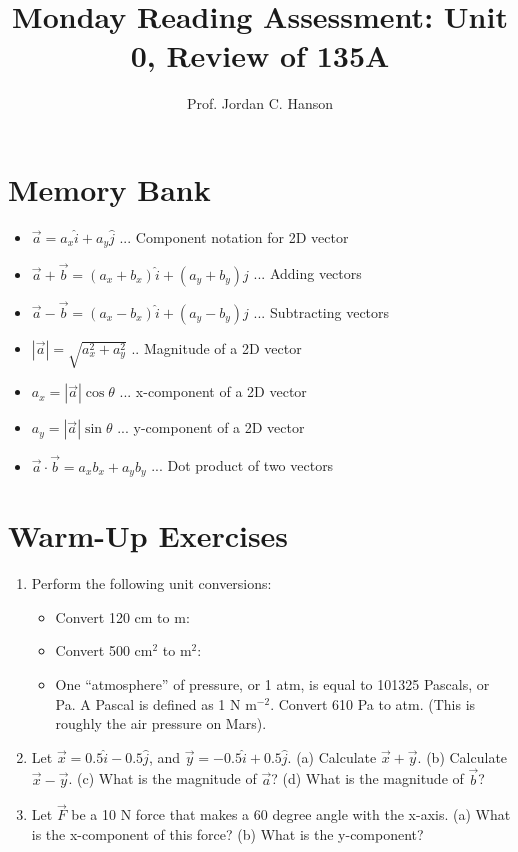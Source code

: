 \documentclass{article}
\begin{document}
\title{Monday Reading Assessment: Unit 0, Review of 135A}
\author{Prof. Jordan C. Hanson}

\maketitle

\section{Memory Bank}

\begin{itemize}
\item $\vec{a} = a_x \hat{i} + a_y \hat{j}$ ... Component notation for 2D vector
\item $\vec{a} + \vec{b} = (a_x + b_x)\hat{i} + (a_y + b_y)\hat{j}$ ... Adding vectors
\item $\vec{a} - \vec{b} = (a_x - b_x)\hat{i} + (a_y - b_y)\hat{j}$ ... Subtracting vectors
\item $|\vec{a}| = \sqrt{a_x^2 + a_y^2}$ .. Magnitude of a 2D vector
\item $a_x = |\vec{a}|\cos\theta$ ... x-component of a 2D vector
\item $a_y = |\vec{a}|\sin\theta$ ... y-component of a 2D vector
\item $\vec{a} \cdot \vec{b} = a_x b_x + a_y b_y$ ... Dot product of two vectors
\end{itemize}

\section{Warm-Up Exercises}

\begin{enumerate}
\item Perform the following unit conversions:
\begin{itemize}
\item Convert 120 cm to m:
\item Convert 500 cm$^2$ to m$^2$:
\item One ``atmosphere'' of pressure, or 1 atm, is equal to 101325 Pascals, or Pa.  A Pascal is defined as 1 N m$^{-2}$.  Convert 610 Pa to atm. (This is roughly the air pressure on Mars). \\ \vspace{1cm}
\end{itemize}
\item Let $\vec{x} = 0.5 \hat{i} - 0.5\hat{j}$, and $\vec{y} = -0.5\hat{i} + 0.5\hat{j}$. (a) Calculate $\vec{x} + \vec{y}$.  (b) Calculate $\vec{x} - \vec{y}$. (c) What is the magnitude of $\vec{a}$? (d) What is the magnitude of $\vec{b}$? \\ \vspace{2cm}
\item Let $\vec{F}$ be a 10 N force that makes a 60 degree angle with the x-axis. (a) What is the x-component of this force? (b) What is the y-component?
\end{enumerate}
\end{document}
